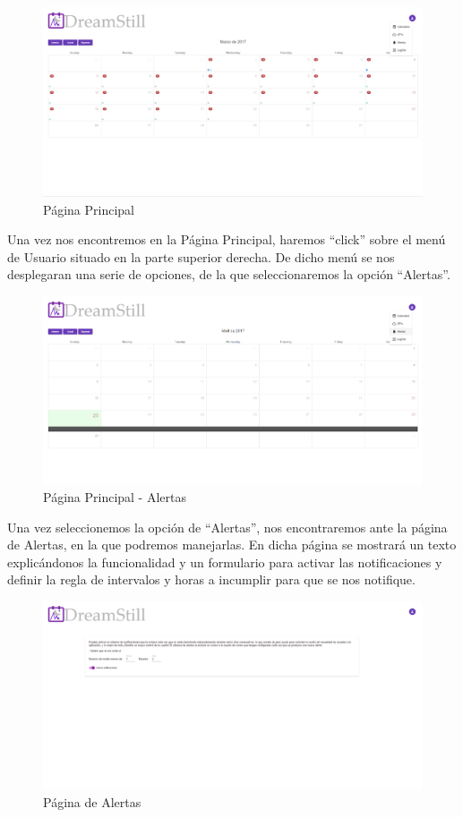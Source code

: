 \documentclass[11pt,openany]{book}
\begin{document}
\begin{figure}[H]
\centering
\includegraphics[totalheight=6cm]{manualUsuario/paginaPrincipal.png}
\caption{Página Principal}
\end{figure}

Una vez nos encontremos en la Página Principal, haremos ``click'' sobre el menú de Usuario situado en la parte superior derecha. De dicho menú se nos desplegaran una serie de opciones, de la que seleccionaremos la opción ``Alertas''.

\begin{figure}[H]
\centering
\includegraphics[totalheight=6cm]{manualUsuario/alertas.png}
\caption{Página Principal - Alertas}
\end{figure}

Una vez seleccionemos la opción de ``Alertas'', nos encontraremos ante la página de Alertas, en la que podremos manejarlas. En dicha página se mostrará un texto explicándonos la funcionalidad y un formulario para activar las notificaciones y definir la regla de intervalos y horas a incumplir para que se nos notifique.

\begin{figure}[H]
\centering
\includegraphics[totalheight=6cm]{manualUsuario/paginaAlertas.png}
\caption{Página de Alertas}
\end{figure}
\end{document}
